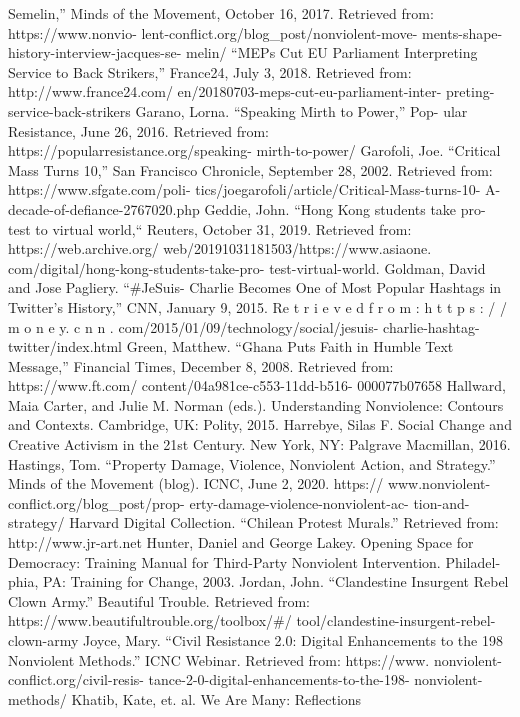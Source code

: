\documentclass[twoside,a4paper,12pt,fleqn,openany]{extbook}
\begin{document}
Semelin,” Minds of the Movement, October 16,
2017. Retrieved from: https://www.nonvio-
lent-conflict.org/blog_post/nonviolent-move-
ments-shape-history-interview-jacques-se-
melin/
“MEPs Cut EU Parliament Interpreting Service
to Back Strikers,” France24, July 3, 2018.
Retrieved from: http://www.france24.com/
en/20180703-meps-cut-eu-parliament-inter-
preting-service-back-strikers
Garano, Lorna. “Speaking Mirth to Power,” Pop-
ular Resistance, June 26, 2016. Retrieved from:
https://popularresistance.org/speaking-
mirth-to-power/
Garofoli, Joe. “Critical Mass Turns 10,” San
Francisco Chronicle, September 28, 2002.
Retrieved from: https://www.sfgate.com/poli-
tics/joegarofoli/article/Critical-Mass-turns-10-
A-decade-of-defiance-2767020.php
Geddie, John. “Hong Kong students take pro-
test to virtual world,“ Reuters, October 31, 2019.
Retrieved from: https://web.archive.org/
web/20191031181503/https://www.asiaone.
com/digital/hong-kong-students-take-pro-
test-virtual-world.
Goldman, David and Jose Pagliery. “#JeSuis-
Charlie Becomes One of Most Popular Hashtags
in Twitter’s History,” CNN, January 9, 2015.
Re t r i e v e d f r o m : h t t p s : / / m o n e y. c n n .
com/2015/01/09/technology/social/jesuis-
charlie-hashtag-twitter/index.html
Green, Matthew. “Ghana Puts Faith in Humble
Text Message,” Financial Times, December 8,
2008. Retrieved from: https://www.ft.com/
content/04a981ce-c553-11dd-b516-
000077b07658
Hallward, Maia Carter, and Julie M. Norman
(eds.). Understanding Nonviolence: Contours
and Contexts. Cambridge, UK: Polity, 2015.
Harrebye, Silas F. Social Change and Creative
Activism in the 21st Century. New York, NY:
Palgrave Macmillan, 2016.
Hastings, Tom. “Property Damage, Violence,
Nonviolent Action, and Strategy.” Minds of the
Movement (blog). ICNC, June 2, 2020. https://
www.nonviolent-conflict.org/blog_post/prop-
erty-damage-violence-nonviolent-ac-
tion-and-strategy/
Harvard Digital Collection. “Chilean Protest
Murals.” Retrieved from: http://www.jr-art.net
Hunter, Daniel and George Lakey. Opening
Space for Democracy: Training Manual for
Third-Party Nonviolent Intervention. Philadel-
phia, PA: Training for Change, 2003.
Jordan, John. “Clandestine Insurgent Rebel
Clown Army.” Beautiful Trouble. Retrieved from:
https://www.beautifultrouble.org/toolbox/#/
tool/clandestine-insurgent-rebel-clown-army
Joyce, Mary. “Civil Resistance 2.0: Digital
Enhancements to the 198 Nonviolent Methods.”
ICNC Webinar. Retrieved from: https://www.
nonviolent-conflict.org/civil-resis-
tance-2-0-digital-enhancements-to-the-198-
nonviolent-methods/
Khatib, Kate, et. al. We Are Many: Reflections
\end{document}
